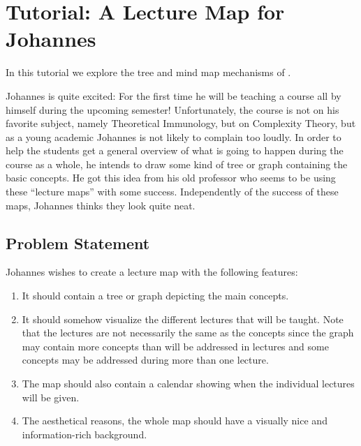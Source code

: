 %
%
%


\section{Tutorial: A Lecture Map for Johannes}

In this tutorial we explore the tree and mind map mechanisms of
\tikzname.

Johannes is quite excited: For the first time he will be teaching a
course all by himself during the upcoming semester! Unfortunately, the
course is not on his favorite subject, namely Theoretical Immunology,
but on Complexity Theory, but as a young academic Johannes is not
likely to complain too loudly. In order to help the students get a
general overview of what is going to happen during the course as a
whole, he intends to draw some kind of tree or graph containing the
basic concepts. He got this idea from his old professor who seems to
be using these ``lecture maps'' with some success. Independently of
the success of these maps, Johannes thinks they look quite neat.



\subsection{Problem Statement}

Johannes wishes to create a lecture map with the following features:
\begin{enumerate}
\item It should contain a tree or graph depicting the main concepts.
\item It should somehow visualize the different lectures that will be
  taught. Note that the lectures are not necessarily the same as the
  concepts since the graph may contain more concepts than will be
  addressed in lectures and some concepts may be addressed during more
  than one lecture.
\item The map should also contain a calendar showing when the
  individual lectures will be given.
\item The aesthetical reasons, the whole map should have a visually
  nice and information-rich background.
\end{enumerate}

